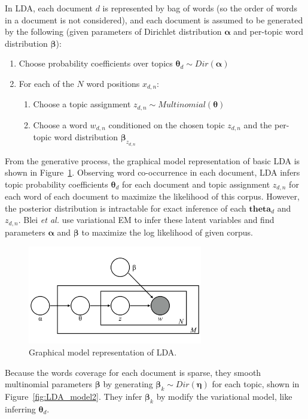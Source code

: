 In LDA, each document $d$ is represented by bag of words (so the order of words in a document is not considered), and each document is assumed to be generated by the following (given parameters of Dirichlet distribution $\boldsymbol{\alpha}$ and per-topic word distribution $\boldsymbol{\beta}$):
\begin{enumerate}[]
	\item Choose probability coefficients over topics $\boldsymbol{\theta}_d {\sim} Dir(\boldsymbol{\alpha})$
	\item For each of the $N$ word positions $x_{d,n}$:
	\begin{enumerate}
		\item Choose a topic assignment $z_{d,n} {\sim} Multinomial(\boldsymbol{\theta})$
		\item Choose a word $w_{d,n}$ conditioned on the chosen topic $z_{d,n}$ and the per-topic word distribution $\boldsymbol{\beta}_{z_{d,n}}$
	\end{enumerate}
\end{enumerate}

From the generative process, the graphical model representation of basic LDA is shown in Figure~\ref{fig:LDA_model}. Observing word co-occurrence in each document, LDA infers topic probability coefficients $\boldsymbol{\theta}_d$ for each document and topic assignment $z_{d,n}$ for each word of each document to maximize the likelihood of this corpus. However, the posterior distribution is intractable for exact inference of each $\boldsymbol{theta}_d$ and $z_{d,n}$. Blei {\it et al.} use variational EM to infer these latent variables and find parameters $\boldsymbol{\alpha}$ and $\boldsymbol{\beta}$ to maximize the log likelihood of given corpus.

\begin{figure}[!t]
\centering
\includegraphics[width=3in]{fig/LDA_model.png}
\caption{Graphical model representation of LDA.}
\label{fig:LDA_model}
\end{figure}

Because the words coverage for each document is sparse, they smooth multinomial parameters $\boldsymbol{\beta}$ by generating $\boldsymbol{\beta}_k \sim Dir(\boldsymbol{\eta})$ for each topic, shown in Figure~\ref{fig:LDA_model2}. They infer $\boldsymbol{\beta}_k$ by modify the variational model, like inferring $\boldsymbol{\theta}_d$.

